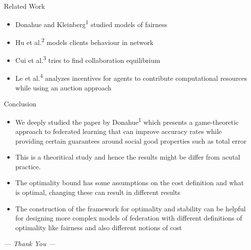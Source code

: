 \documentclass[aspectratio=169]{beamer}
\begin{document}
\begin{frame}[label={sec:org735ed63}]{Related Work}
\begin{itemize}
\item Donahue and Kleinberg\textsuperscript{1} studied models of fairness
\item Hu et al.\textsuperscript{2} models clients behaviour in network
\item Cui et al.\textsuperscript{3} tries to find collaboration equilibrium
\item Le et al.\textsuperscript{4} analyzes incentives for agents to contribute computational resources while using an auction approach
\end{itemize}

\end{frame}

\begin{frame}[label={sec:org245f002}]{Conclusion}
\begin{itemize}
\item We deeply studied the paper by Donahue\textsuperscript{1} which presents a game-theoretic approach to federated learning that can improve accuracy rates while providing certain guarantees around social good properties such as total error
\item This is a theoritical study and hence the results might be differ from acutal practice.
\item The optimality bound has some assumptions on the cost definition and what is optimal, changing these can result in different results
\item The construction of the framework for optimality and stability can be helpful for designing more complex models of federation with different definitions of optimality like fairness and also different notions of cost
\end{itemize}

\centering \Large \emph{--- Thank You ---}

\end{frame}
\end{document}
